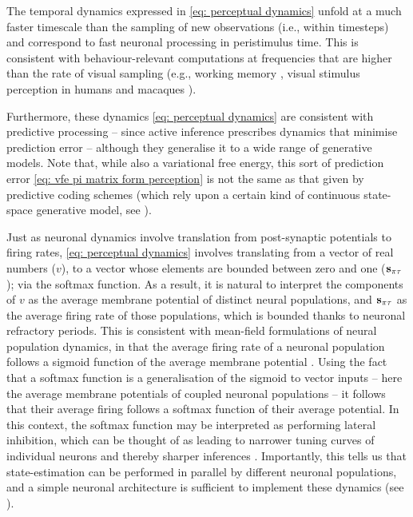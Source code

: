 \documentclass[review,12pt,authoryear]{elsarticle}
\begin{document}
The temporal dynamics expressed in \eqref{eq: perceptual dynamics} unfold at a much faster timescale than the sampling of new observations (i.e., within timesteps) and correspond to fast neuronal processing in peristimulus time. This is consistent with behaviour-relevant computations at frequencies that are higher than the rate of visual sampling (e.g., working memory \citep{lundqvistGammaBetaBursts2016}, visual stimulus perception in humans \citep{hanslmayrPrestimulusOscillatoryPhase2013} and macaques \citep{rollsProcessingSpeedCerebral1994}).

Furthermore, these dynamics \eqref{eq: perceptual dynamics} are consistent with predictive processing \citep{raoPredictiveCodingVisual1999,bastosCanonicalMicrocircuitsPredictive2012} -- since active inference prescribes dynamics that minimise prediction error -- although they generalise it to a wide range of generative models. Note that, while also a variational free energy, this sort of prediction error \eqref{eq: vfe pi matrix form perception} is not the same as that given by predictive coding schemes (which rely upon a certain kind of continuous state-space generative model, see \citep{buckleyFreeEnergyPrinciple2017,fristonVariationalFreeEnergy2007,bogaczTutorialFreeenergyFramework2017}).

Just as neuronal dynamics involve translation from post-synaptic potentials to firing rates, \eqref{eq: perceptual dynamics} involves translating from a vector of real numbers ($v$), to a vector whose elements are bounded between zero and one ($\bold s_{\pi\tau}$); via the softmax function. As a result, it is natural to interpret the components of $v$ as the average membrane potential of distinct neural populations, and $\bold s_{\pi\tau}$ as the average firing rate of those populations, which is bounded thanks to neuronal refractory periods. This is consistent with mean-field formulations of neural population dynamics, in that the average firing rate of a neuronal population follows a sigmoid function of the average membrane potential \citep{marreirosPopulationDynamicsVariance2008,decoDynamicBrainSpiking2008,moranNeuralMassesFields2013}.
Using the fact that a softmax function is a generalisation of the sigmoid to vector inputs -- here the average membrane potentials of coupled neuronal populations -- it follows that their average firing follows a softmax function of their average potential. In this context, the softmax function may be interpreted as performing lateral inhibition, which can be thought of as leading to narrower tuning curves of individual neurons and thereby sharper inferences \citep{vonbekesySensoryInhibition1967}. Importantly, this tells us that state-estimation can be performed in parallel by different neuronal populations, and a simple neuronal architecture is sufficient to implement these dynamics (see \citet[Figure 6]{parrNeuronalMessagePassing2019}).
\end{document}

